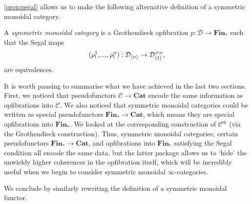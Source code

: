 \documentclass{MetricNotes2023}
\begin{document}
\ref{prop:segal} allows us to make the following alternative definition of a symmetric monoidal category.

\begin{definition}\label{def:newmonoidal}
A \textit{symmetric monoidal category} is a Grothendieck opfibration \(p : \mathcal{D}\to \textbf{Fin}_*\) such that the Segal maps
\[(\rho_!^1, ..., \rho_!^n) : \mathcal{D}_{\langle n\rangle}\to \mathcal{D}_{\langle1\rangle}^{\times n},\]
are equivalences.
\end{definition}

It is worth pausing to summarise what we have achieved in the last two sections. First, we noticed that pseudofunctors \(\mathcal{C}\to \textbf{Cat}\) encode the same information as opfibrations into \(\mathcal{C}\). We also noticed that symmetric monoidal categories could be written as special pseudofunctors \(\textbf{Fin}_* \to \textbf{Cat}\), which means they are special opfibrations into \(\textbf{Fin}_*\). We looked at the corresponding construction of \(\mathcal{C}^\otimes\) (via the Grothendieck construction). Thus, symmetric monoidal categories, certain pseudofunctors \(\textbf{Fin}_* \to \textbf{Cat}\), and opfibrations into \(\textbf{Fin}_*\) satisfying the Segal condition all encode the same data, but the latter package allows us to `hide' the unwieldy higher coherences in the opfibration itself, which will be incredibly useful when we begin to consider symmetric monoidal \(\infty\)-categories.

We conclude by similarly rewriting the definition of a symmetric monoidal functor. 
\end{document}
